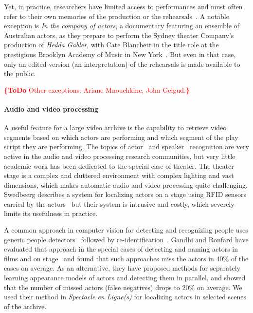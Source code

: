 \documentclass[conference]{IEEEtran}
\newcommand{\todo}[1]{\noindent\textcolor{red}{{\bf \{ToDo} #1{\bf \}}}}
\begin{document}
Yet, in practice, researchers have limited access to performances and must often refer to their own memories of the production or the rehearsals~\cite{Selbourne82,Sher85,Stafford00,Stern00}. A notable exception is {\em In the company of actors}, a documentary featuring an ensemble of Australian actors, as they prepare to perform the Sydney theater Company's production of \emph{Hedda Gabler}, with Cate Blanchett in the title role at the prestigious Brooklyn Academy of Music  in New York~\cite{Darling07}. But even in that case, only an edited version (an interpretation)  of the rehearsals is made available to the public. 

\todo{Other exceptions: Ariane Mnouchkine, John Gelgud.}

\paragraph*{Audio and video processing}
A useful feature for a large video archive is the capability to retrieve video segments based on which actors 
are performing and which segment of the play script they are performing. The topics of actor~\cite{Hilton06} and speaker~\cite{Miro12} recognition are very active in the audio and video processing research communities, but very little academic 
work has been dedicated to the special case of theater. The theater stage is a complex and cluttered environment 
with complex lighting and vast dimensions, which makes automatic audio and video processing quite challenging. 
Swedbeerg describes a system for localizing actors on a stage using RFID sensors carried by the actors~\cite{Swedberg}
but their system is intrusive and costly, which severely limits its usefulness in practice.

A common approach in computer vision for detecting and recognizing people uses generic people detectors~\cite{Ronfard02,
Dalal05,Felzenszwalb10,Andriluka12} followed by re-identification~\cite{TapaswiBS12}. Gandhi and Ronfard have evaluated 
that approach in the special cases of detecting and naming actors in films and on stage~\cite{Gandhi13} and found that such 
approaches miss the actors in 40\% of the cases on average. As an alternative, they have proposed
methods for separately learning appearance models of actors and detecting them in parallel, and showed that the number
of missed actors (false negatives) drops to 20\% on average. We used their method in \emph{Spectacle en Ligne(s)} for localizing
actors in selected scenes of the archive.
\end{document}
